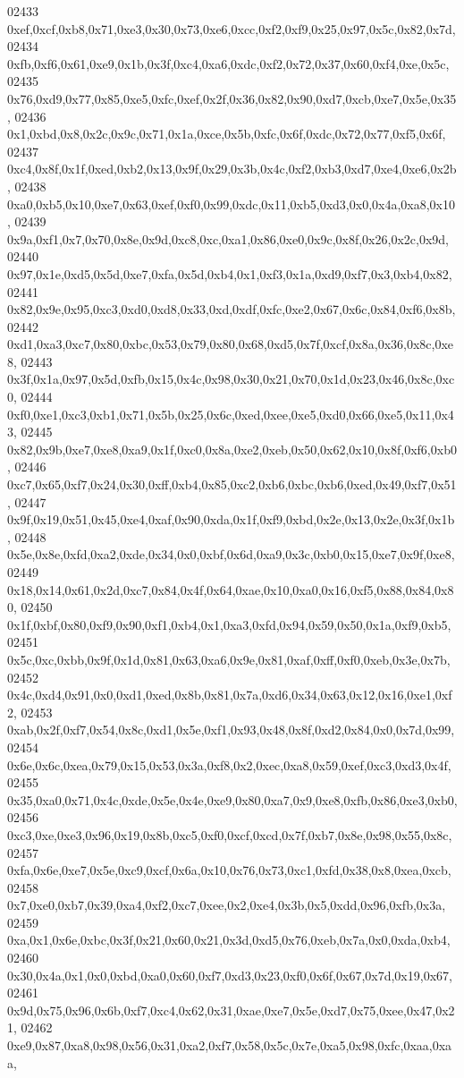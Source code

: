 \begin{DoxyCode}
02433   0xef,0xcf,0xb8,0x71,0xe3,0x30,0x73,0xe6,0xcc,0xf2,0xf9,0x25,0x97,0x5c,0x82,0x7d,
02434   0xfb,0xf6,0x61,0xe9,0x1b,0x3f,0xc4,0xa6,0xdc,0xf2,0x72,0x37,0x60,0xf4,0xe,0x5c,
02435   0x76,0xd9,0x77,0x85,0xe5,0xfc,0xef,0x2f,0x36,0x82,0x90,0xd7,0xcb,0xe7,0x5e,0x35,
02436   0x1,0xbd,0x8,0x2c,0x9c,0x71,0x1a,0xce,0x5b,0xfc,0x6f,0xdc,0x72,0x77,0xf5,0x6f,
02437   0xc4,0x8f,0x1f,0xed,0xb2,0x13,0x9f,0x29,0x3b,0x4c,0xf2,0xb3,0xd7,0xe4,0xe6,0x2b,
02438   0xa0,0xb5,0x10,0xe7,0x63,0xef,0xf0,0x99,0xdc,0x11,0xb5,0xd3,0x0,0x4a,0xa8,0x10,
02439   0x9a,0xf1,0x7,0x70,0x8e,0x9d,0xc8,0xc,0xa1,0x86,0xe0,0x9c,0x8f,0x26,0x2c,0x9d,
02440   0x97,0x1e,0xd5,0x5d,0xe7,0xfa,0x5d,0xb4,0x1,0xf3,0x1a,0xd9,0xf7,0x3,0xb4,0x82,
02441   0x82,0x9e,0x95,0xc3,0xd0,0xd8,0x33,0xd,0xdf,0xfc,0xe2,0x67,0x6c,0x84,0xf6,0x8b,
02442   0xd1,0xa3,0xc7,0x80,0xbc,0x53,0x79,0x80,0x68,0xd5,0x7f,0xcf,0x8a,0x36,0x8c,0xe8,
02443   0x3f,0x1a,0x97,0x5d,0xfb,0x15,0x4c,0x98,0x30,0x21,0x70,0x1d,0x23,0x46,0x8c,0xc0,
02444   0xf0,0xe1,0xc3,0xb1,0x71,0x5b,0x25,0x6c,0xed,0xee,0xe5,0xd0,0x66,0xe5,0x11,0x43,
02445   0x82,0x9b,0xe7,0xe8,0xa9,0x1f,0xc0,0x8a,0xe2,0xeb,0x50,0x62,0x10,0x8f,0xf6,0xb0,
02446   0xc7,0x65,0xf7,0x24,0x30,0xff,0xb4,0x85,0xc2,0xb6,0xbc,0xb6,0xed,0x49,0xf7,0x51,
02447   0x9f,0x19,0x51,0x45,0xe4,0xaf,0x90,0xda,0x1f,0xf9,0xbd,0x2e,0x13,0x2e,0x3f,0x1b,
02448   0x5e,0x8e,0xfd,0xa2,0xde,0x34,0x0,0xbf,0x6d,0xa9,0x3c,0xb0,0x15,0xe7,0x9f,0xe8,
02449   0x18,0x14,0x61,0x2d,0xc7,0x84,0x4f,0x64,0xae,0x10,0xa0,0x16,0xf5,0x88,0x84,0x80,
02450   0x1f,0xbf,0x80,0xf9,0x90,0xf1,0xb4,0x1,0xa3,0xfd,0x94,0x59,0x50,0x1a,0xf9,0xb5,
02451   0x5c,0xc,0xbb,0x9f,0x1d,0x81,0x63,0xa6,0x9e,0x81,0xaf,0xff,0xf0,0xeb,0x3e,0x7b,
02452   0x4c,0xd4,0x91,0x0,0xd1,0xed,0x8b,0x81,0x7a,0xd6,0x34,0x63,0x12,0x16,0xe1,0xf2,
02453   0xab,0x2f,0xf7,0x54,0x8c,0xd1,0x5e,0xf1,0x93,0x48,0x8f,0xd2,0x84,0x0,0x7d,0x99,
02454   0x6e,0x6c,0xea,0x79,0x15,0x53,0x3a,0xf8,0x2,0xec,0xa8,0x59,0xef,0xc3,0xd3,0x4f,
02455   0x35,0xa0,0x71,0x4c,0xde,0x5e,0x4e,0xe9,0x80,0xa7,0x9,0xe8,0xfb,0x86,0xe3,0xb0,
02456   0xc3,0xe,0xe3,0x96,0x19,0x8b,0xc5,0xf0,0xcf,0xcd,0x7f,0xb7,0x8e,0x98,0x55,0x8c,
02457   0xfa,0x6e,0xe7,0x5e,0xc9,0xcf,0x6a,0x10,0x76,0x73,0xc1,0xfd,0x38,0x8,0xea,0xcb,
02458   0x7,0xe0,0xb7,0x39,0xa4,0xf2,0xc7,0xee,0x2,0xe4,0x3b,0x5,0xdd,0x96,0xfb,0x3a,
02459   0xa,0x1,0x6e,0xbc,0x3f,0x21,0x60,0x21,0x3d,0xd5,0x76,0xeb,0x7a,0x0,0xda,0xb4,
02460   0x30,0x4a,0x1,0x0,0xbd,0xa0,0x60,0xf7,0xd3,0x23,0xf0,0x6f,0x67,0x7d,0x19,0x67,
02461   0x9d,0x75,0x96,0x6b,0xf7,0xc4,0x62,0x31,0xae,0xe7,0x5e,0xd7,0x75,0xee,0x47,0x21,
02462   0xe9,0x87,0xa8,0x98,0x56,0x31,0xa2,0xf7,0x58,0x5c,0x7e,0xa5,0x98,0xfc,0xaa,0xaa,

\end{DoxyCode}
